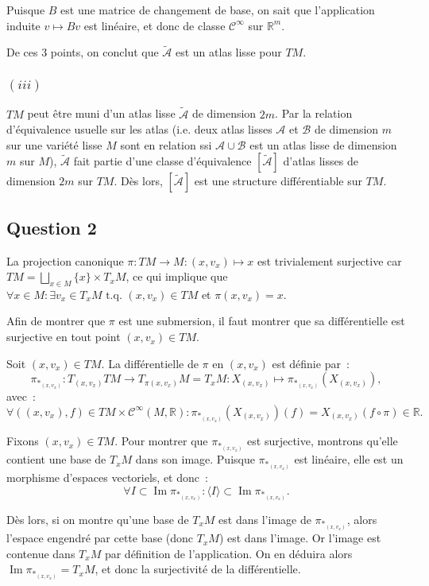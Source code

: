 \documentclass{article}
\newcommand{\R}{\mathbb R}
\DeclareMathOperator{\Imf}{Im}
\begin{document}
\begin{enumerate}
		Puisque $B$ est une matrice de changement de base, on sait que l'application induite $v \mapsto Bv$ est linéaire, et donc de
		classe $\mathcal C^\infty$ sur $\R^m$.
\end{enumerate}

De ces 3 points, on conclut que $\widetilde {\mathcal A}$ est un atlas lisse pour $TM$.

\subsubsection*{$(iii)$}
$TM$ peut être muni d'un atlas lisse $\widetilde {\mathcal A}$ de dimension $2m$. Par la relation d'équivalence usuelle sur les atlas
(i.e. deux atlas lisses $\mathcal A$ et $\mathcal B$ de dimension $m$ sur une variété lisse $M$ sont en relation ssi
$\mathcal A \cup \mathcal B$ est un atlas lisse de dimension $m$ sur $M$), $\widetilde {\mathcal A}$ fait partie d'une classe d'équivalence
$[\widetilde {\mathcal A}]$ d'atlas lisses de dimension $2m$ sur $TM$. Dès lors, $[\widetilde {\mathcal A}]$ est une structure différentiable
sur $TM$.

\subsection*{Question 2}
La projection canonique $\pi : TM \to M : (x, v_x) \mapsto x$ est trivialement surjective car $TM = \bigsqcup_{x \in M} \{x\} \times T_xM$,
ce qui implique que $\forall x \in M : \exists v_x \in T_xM \text{ t.q. } (x, v_x) \in TM$ et $\pi(x, v_x) = x$.

Afin de montrer que $\pi$ est une submersion, il faut montrer que sa différentielle est surjective en tout point $(x, v_x) \in TM$.

Soit $(x, v_x) \in TM$. La différentielle de $\pi$ en $(x, v_x)$ est définie par~:
\[\pi_{*_{(x, v_x)}} : T_{(x, v_x)}TM \to T_{\pi(x, v_x)}M = T_xM : X_{(x, v_x)} \mapsto \pi_{*_{(x, v_x)}}(X_{(x, v_x)}),\]
avec~:
\[\forall ((x, v_x), f) \in TM \times \mathcal C^\infty(M, \R) : \pi_{*_{(x, v_x)}}(X_{(x, v_x)})(f) = X_{(x, v_x)}(f \circ \pi) \in \R.\]

Fixons $(x, v_x) \in TM$. Pour montrer que $\pi_{*_{(x, v_x)}}$ est surjective, montrons qu'elle contient une base de $T_xM$ dans son image.
Puisque $\pi_{*_{(x, v_x)}}$ est linéaire, elle est un morphisme d'espaces vectoriels, et donc~:
\[\forall I \subset \Imf \pi_{*_{(x, v_x)}} : \langle I \rangle \subset \Imf \pi_{*_{(x, v_x)}}.\]

Dès lors, si on montre qu'une base de $T_xM$ est dans l'image de $\pi_{*_{(x, v_x)}}$, alors l'espace engendré par cette base (donc $T_xM$)
est dans l'image. Or l'image est contenue dans $T_xM$ par définition de l'application. On en déduira alors $\Imf \pi_{*_{(x, v_x)}} = T_xM$,
et donc la surjectivité de la différentielle.
\end{document}
